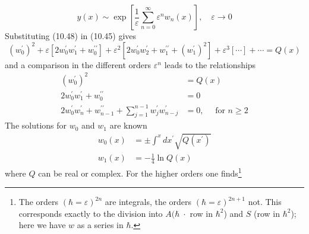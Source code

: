 \begin{equation}
    y(x) \sim \exp \left[\frac{1}{\varepsilon} \sum_{n=0}^{\infty} \varepsilon^{n} w_{n}(x)\right], \quad \varepsilon \rightarrow 0
    \end{equation}
Substituting (10.48) in (10.45) gives
\begin{equation}
    \left(w_{0}^{\prime}\right)^{2}+\varepsilon\left[2 w_{0}^{\prime} w_{1}^{\prime}+w_{0}^{\prime \prime}\right]+\varepsilon^{2}\left[2 w_{0}^{\prime} w_{2}^{\prime}+w_{1}^{\prime \prime}+\left(w_{1}^{\prime}\right)^{2}\right]+\varepsilon^{3}[\cdots]+\cdots=Q(x)
    \end{equation}
and a comparison in the different orders $\varepsilon^n$ leads to the relationships
\begin{equation}
\begin{aligned}\left(w_{0}^{\prime}\right)^{2} &=Q(x) \\ 2 w_{0}^{\prime} w_{1}^{\prime}+w_{0}^{\prime \prime} &=0 \\ 2 w_{0}^{\prime} w_{n}^{\prime}+w_{n-1}^{\prime \prime}+\sum_{j=1}^{n-1} w_{j}^{\prime} w_{n-j}^{\prime} &=0, \quad \text { for } n \geq 2 \end{aligned}
\end{equation}
The solutions for $w_0$ and $w_1$ are known
\begin{equation}
\begin{aligned} w_{0}(x) &=\pm \int^{x} d x^{\prime} \sqrt{Q\left(x^{\prime}\right)} \\ w_{1}(x) &=-\frac{1}{4} \ln Q(x) \end{aligned}
\end{equation}
where $Q$ can be real or complex. For the higher orders one finds\footnote{The orders $(\hbar=\varepsilon)^{2n}$ are integrals, the orders $(\hbar=\varepsilon)^{2n+1}$ not. This corresponds exactly to the division into $A (\hbar\;\cdot$ row in $\hbar^2$) and $S$ (row in $\hbar^2$); here we have $w$ as a series in $\hbar$.}


